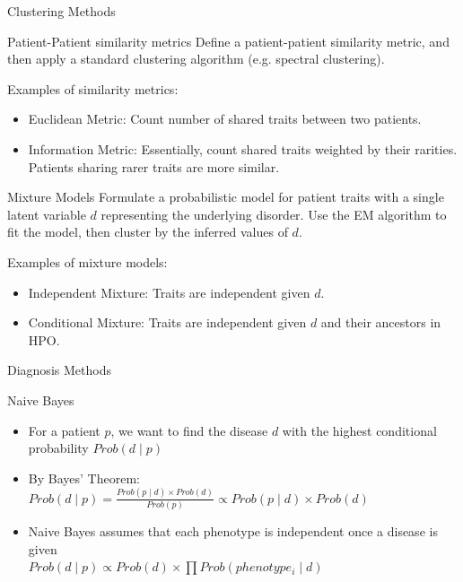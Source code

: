 \documentclass[final]{beamer} %
\begin{document}
\begin{frame}{}
\begin{columns}[T]
    \begin{column}{0.3\linewidth}
     \begin{block}{\Huge Clustering Methods}
     \Large
		\begin{block}{\Large Patient-Patient similarity metrics}
			Define a patient-patient similarity metric, and then apply a standard clustering algorithm (e.g. spectral clustering).

			Examples of similarity metrics:
			\begin{itemize}
				\item Euclidean Metric: Count number of shared traits between two patients.
				\item Information Metric: Essentially, count shared traits weighted by their rarities. Patients sharing rarer traits are more similar.
			\end{itemize}
		\end{block}
		\begin{block}{\Large Mixture Models}
			Formulate a probabilistic model for patient traits with a single latent variable $d$ representing the underlying disorder. Use the EM algorithm to fit the model, then cluster by the inferred values of $d$.

			Examples of mixture models:
			\begin{itemize}
				\item Independent Mixture: Traits are independent given $d$.
				\item Conditional Mixture: Traits are independent given $d$ and their ancestors in HPO.
			\end{itemize}
		\end{block}
     \end{block}
     \vspace{3cm}

     \begin{block}{\Huge Diagnosis Methods}
   
     \begin{block}{\Large Naive Bayes}
     \begin{itemize}
        \Large
    \item
    For a patient $p$, we want to find the disease $d$ with the highest conditional probability $Prob(d \mid p )$
  \vspace{1cm}
  \item
   By Bayes' Theorem: \\
   $Prob(d \mid p) = \frac{Prob(p \mid d) \times Prob(d)}{Prob(p)} \propto Prob(p \mid d) \times Prob(d)$
  \vspace{1cm}
   \item
   Naive Bayes assumes that each phenotype is independent once a disease is given \\
   $Prob(d \mid p) \propto Prob(d) \times \prod Prob(phenotype_i \mid d)$
     \end{itemize}
   \end{block}
    \vspace{1cm}


\end{block}
\end{column}
\end{columns}
\end{frame}
\end{document}

